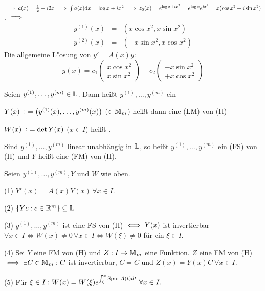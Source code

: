 \documentclass{article}
\begin{document}
\begin{beispiele}
$\implies a(x)=\frac{1}{x}+i2x\implies\int a(x)\text{d}x=\log x+ix^2 \implies z_0(x)=e^{\log x + ix^2}=e^{\log x}e^{ix^2}=x(\cos x^2 + i\sin x^2)$.
$\implies$
\begin{eqnarray*}
	y^{(1)}(x)&=&(x\cos x^2, x\sin x^2)\\
	y^{(2)}(x)&=&(-x\sin x^2, x\cos x^2)
\end{eqnarray*}
Die allgemeine L"osung von $y'=A(x)y: $
\[
	y(x)=c_1\begin{pmatrix}x\cos x^2\\ x\sin x^2\end{pmatrix}+c_2\begin{pmatrix}-x\sin x^2\\ +x\cos x^2\end{pmatrix}
\]
\end{beispiele}



\begin{definition}
\begin{liste}
\item Seien $y^{(1)},\dots,y^{(m)} \in \mathbb{L}$. Dann heißt $y^{(1)},\dots,y^{(m)}$ ein 
\item $Y(x)\da \left(y^{(1)}(x),\ldots,y^{(m)}(x)\right)$ ($\in \mathbb{M}_m$) heißt dann eine  (LM) von (H)
\item $W(x) \da  \det Y(x)$ ($x\in I$) heißt .
\item Sind $y^{(1)},\dots,y^{(m)}$ linear unabhängig in $\mathbb{L}$, so hei\ss t $y^{(1)},\dots,y^{(m)}$ ein  (FS) von (H) und $Y$ hei\ss t eine  (FM) von (H).

\end{liste}
\end{definition}

\begin{satz} %
Seien $y^{(1)},\dots,y^{(m)}, Y$ und $W$ wie oben.
\begin{liste}
\item[(1)] $Y'(x) = A(x)Y(x) \, \forall x \in I.$
\item[(2)] $\{ Yc:c\in \mathbb{R}^m \} \subseteq \mathbb{L}$
\item[(3)] $y^{(1)},\dots,y^{(m)}$ ist eine FS von (H) $\iff Y(x)$ ist invertierbar $\forall x \in I \Leftrightarrow W(x) \not= 0 \, \forall x \in I \Leftrightarrow W(\xi) \not= 0$ für ein $\xi \in I$.
\item[(4)] Sei $Y$ eine FM von (H) und $Z: I \rightarrow \mathbb{M}_m$ eine Funktion. $Z$ eine FM von (H) $\iff \exists C \in \mathbb{M}_m: C$ ist invertierbar, $C = \overline{C}$ und $Z(x)=Y(x)C \ \forall x \in I.$
\item[(5)] Für $\xi \in I: W(x) = W(\xi)e^{\int_{\xi}^{x} \mathop{\rm Spur}\nolimits A(t)dt} \ \forall x \in I.$
\end{liste}
\end{satz}
\end{document}
